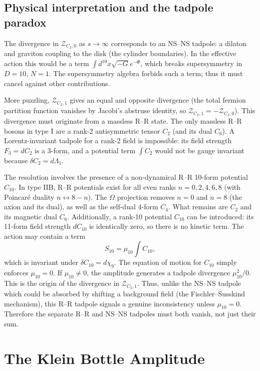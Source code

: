 \documentclass[11pt,a4paper]{article}
\begin{document}
\subsection{Physical interpretation and the tadpole paradox}
The divergence in $\mathcal{Z}_{C_2,0}$ as $s\to\infty$ corresponds to an NS–NS tadpole: a dilaton and graviton coupling to the disk (the cylinder boundaries). In the effective action this would be a term $\int d^{10}x \sqrt{-G} e^{-\Phi}$, which breaks supersymmetry in $D=10$, $N=1$. The supersymmetry algebra forbids such a term; thus it must cancel against other contributions.

More puzzling, $\mathcal{Z}_{C_2,1}$ gives an equal and opposite divergence (the total fermion partition function vanishes by Jacobi's abstruse identity, so $\mathcal{Z}_{C_2,1} = -\mathcal{Z}_{C_2,0}$). This divergence must originate from a massless R–R state. The only massless R–R bosons in type I are a rank-2 antisymmetric tensor $C_2$ (and its dual $C_6$). A Lorentz-invariant tadpole for a rank-2 field is impossible: its field strength $F_3 = dC_2$ is a 3-form, and a potential term $\int C_2$ would not be gauge invariant because $\delta C_2 = d\Lambda_1$.

The resolution involves the presence of a non-dynamical R–R 10-form potential $C_{10}$. In type IIB, R–R potentials exist for all even ranks $n=0,2,4,6,8$ (with Poincaré duality $n \leftrightarrow 8-n$). The $\Omega$ projection removes $n=0$ and $n=8$ (the axion and its dual), as well as the self-dual 4-form $C_4$. What remains are $C_2$ and its magnetic dual $C_6$. Additionally, a rank-10 potential $C_{10}$ can be introduced: its 11-form field strength $dC_{10}$ is identically zero, so there is no kinetic term. The action may contain a term
\begin{equation}
S_{10} = \mu_{10} \int C_{10},
\label{eq:C10}
\end{equation}
which is invariant under $\delta C_{10} = d\chi_9$. The equation of motion for $C_{10}$ simply enforces $\mu_{10}=0$. If $\mu_{10} \neq 0$, the amplitude generates a tadpole divergence $\mu_{10}^2 / 0$. This is the origin of the divergence in $\mathcal{Z}_{C_2,1}$. Thus, unlike the NS–NS tadpole which could be absorbed by shifting a background field (the Fischler–Susskind mechanism), this R–R tadpole signals a genuine inconsistency unless $\mu_{10}=0$. Therefore the separate R–R and NS–NS tadpoles must both vanish, not just their sum.

\section{The Klein Bottle Amplitude}
\end{document}
